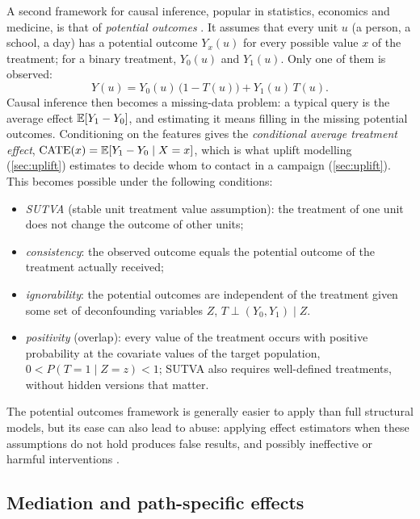 A second framework for causal inference, popular in statistics, economics and medicine, is that of
\emph{potential outcomes} \citep{rubin1974estimating,imbens2015causal}. It assumes that every unit
$u$ (a person, a school, a day) has a potential outcome $Y_x(u)$ for every possible value $x$ of the
treatment; for a binary treatment, $Y_0(u)$ and $Y_1(u)$. Only one of them is observed:
\begin{equation}
  Y(u)=Y_0(u)\,\bigl(1-T(u)\bigr)+Y_1(u)\,T(u).
\end{equation}
Causal inference then becomes a missing-data problem: a typical query is the average effect
$\mathbb{E}[Y_1-Y_0]$, and estimating it means filling in the missing potential outcomes. Conditioning on the
features gives the \emph{conditional average treatment effect}, $\mathrm{CATE}(x)=\mathbb{E}[Y_1-Y_0\mid X=x]$, which is
what uplift modelling (\cref{sec:uplift}) estimates to decide whom to contact in a campaign (\cref{sec:uplift}). This becomes
possible under the following conditions:
\begin{itemize}
  \item \emph{SUTVA} (stable unit treatment value assumption): the treatment of one unit does not
        change the outcome of other units;
  \item \emph{consistency}: the observed outcome equals the potential outcome of the treatment
        actually received;
  \item \emph{ignorability}: the potential outcomes are independent of the treatment given some
        set of deconfounding variables $Z$, $T\perp(Y_0,Y_1)\mid Z$.
  \item \emph{positivity} (overlap): every value of the treatment occurs with positive probability
        at the covariate values of the target population, $0<P(T=1\mid Z=z)<1$; SUTVA also requires
        well-defined treatments, without hidden versions that matter.
\end{itemize}
The potential outcomes framework is generally easier to apply than full structural models, but
its ease can also lead to abuse: applying effect estimators when these assumptions do not hold
produces false results, and possibly ineffective or harmful interventions \citep{hernan2020causal}.

\subsection{Mediation and path-specific effects\extsec}

